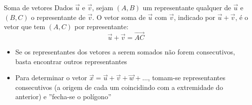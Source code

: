\begin{frame}{Soma de vetores}
    Dados \(\vec{u}\) e \(\vec{v}\), sejam \((A,B)\) um representante qualquer de \(\vec{u}\) e \((B,C)\) o representante
    de \(\vec{v}\). O vetor soma de \(\vec{u}\) com \(\vec{v}\), indicado por \(\vec{u}+\vec{v}\), é o vetor que tem \((A,C)\)
    por representante:
    \[
        \vec{u}+\vec{v}=\vec{AC}
    \]
    \begin{center}
    \end{center}

     {
        \begin{itemize}
            \item Se os representantes dos vetores a serem somados não forem consecutivos, basta encontrar
                outros representantes
            \item Para determinar o vetor \(\vec{x}=\vec{u}+\vec{v}+\vec{w}+\ldots\), tomam-se representantes consecutivos
                (a origem de cada um coincidindo com a extremidade do anterior) e ''fecha-se o polígono''
        \end{itemize}
    }
\end{frame}

